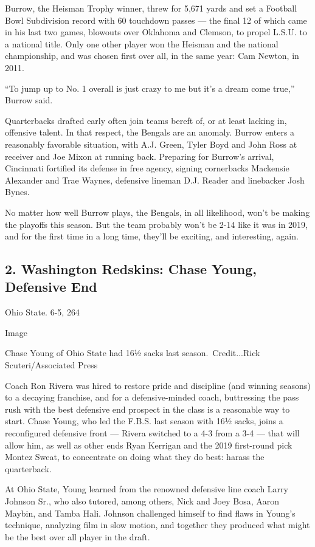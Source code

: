 Burrow, the Heisman Trophy winner, threw for 5,671 yards and set a
Football Bowl Subdivision record with 60 touchdown passes --- the final
12 of which came in his last two games, blowouts over Oklahoma and
Clemson, to propel L.S.U. to a national title. Only one other player won
the Heisman and the national championship, and was chosen first over
all, in the same year: Cam Newton, in 2011.

``To jump up to No. 1 overall is just crazy to me but it's a dream come
true,'' Burrow said.

Quarterbacks drafted early often join teams bereft of, or at least
lacking in, offensive talent. In that respect, the Bengals are an
anomaly. Burrow enters a reasonably favorable situation, with A.J.
Green, Tyler Boyd and John Ross at receiver and Joe Mixon at running
back. Preparing for Burrow's arrival, Cincinnati fortified its defense
in free agency, signing cornerbacks Mackensie Alexander and Trae Waynes,
defensive lineman D.J. Reader and linebacker Josh Bynes.

No matter how well Burrow plays, the Bengals, in all likelihood, won't
be making the playoffs this season. But the team probably won't be 2-14
like it was in 2019, and for the first time in a long time, they'll be
exciting, and interesting, again.

\hypertarget{2-washington-redskins-chase-young-defensive-end}{%
\subsection{2. Washington Redskins: Chase Young, Defensive
End}\label{2-washington-redskins-chase-young-defensive-end}}

Ohio State. 6-5, 264

Image

Chase Young of Ohio State had 16½ sacks last season.~Credit...Rick
Scuteri/Associated Press

Coach Ron Rivera was hired to restore pride and discipline (and winning
seasons) to a decaying franchise, and for a defensive-minded coach,
buttressing the pass rush with the best defensive end prospect in the
class is a reasonable way to start. Chase Young, who led the F.B.S. last
season with 16½ sacks, joins a reconfigured defensive front --- Rivera
switched to a 4-3 from a 3-4 --- that will allow him, as well as other
ends Ryan Kerrigan and the 2019 first-round pick Montez Sweat, to
concentrate on doing what they do best: harass the quarterback.

At Ohio State, Young learned from the renowned defensive line coach
Larry Johnson Sr., who also tutored, among others, Nick and Joey Bosa,
Aaron Maybin, and Tamba Hali. Johnson challenged himself to find flaws
in Young's technique, analyzing film in slow motion, and together they
produced what might be the best over all player in the draft.

